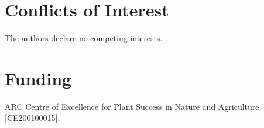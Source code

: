 \documentclass[9pt,twocolumn,twoside,lineno]{gsajnl}
\begin{document}
\section*{Conflicts of Interest}
The authors declare no competing interests.

\section*{Funding}
ARC Centre of Excellence for Plant Success in Nature and Agriculture [CE200100015].




\appendix
%
%
\renewcommand{\theappsec}{S\arabic{appsec}}
\makeatletter
\newcommand{\appsection}[2]{%
  \refstepcounter{appsec}%
  \section*{Appendix \theappsec: #2}%
  \phantomsection%
  \label{#1}%
  \addcontentsline{toc}{section}{Appendix \theappsec: #2}%
}
\makeatother
\end{document}
